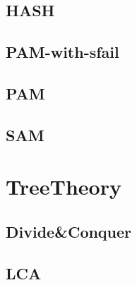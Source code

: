\subsection{HASH}
\raggedbottom
\hrulefill
\subsection{PAM-with-sfail}
\raggedbottom
\hrulefill
\subsection{PAM}
\raggedbottom
\hrulefill
\subsection{SAM}
\raggedbottom
\hrulefill

\section{TreeTheory}
\subsection{Divide\&Conquer}
\raggedbottom
\hrulefill
\subsection{LCA}
\raggedbottom
\hrulefill

